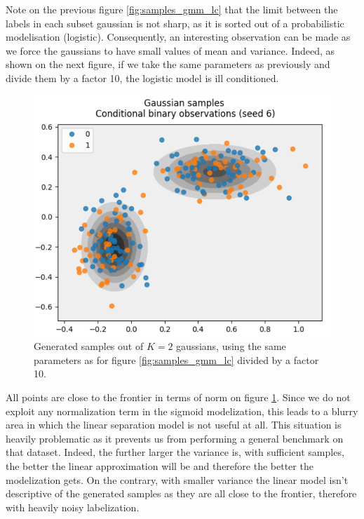 Note on the previous figure \ref{fig:samples_gmm_lc} that the limit between the labels in each subset gaussian is not sharp,
as it is sorted out of a probabilistic modelisation (logistic).
Consequently, an interesting observation can be made as we force the gaussians to have small values of mean and variance.
Indeed, as shown on the next figure, if we take the same parameters as previously and divide them by a factor 10,
the logistic model is ill conditioned.
\begin{figure}[H]
    \center
    \includegraphics[scale=0.7]{images/samples_gmm_lc_badconditioning}
    \caption{Generated samples out of $K=2$ gaussians, using the same parameters as for figure \ref{fig:samples_gmm_lc} divided by a factor 10.}
    \label{fig:gmm_lc_badconditioning}
\end{figure}

All points are close to the frontier in terms of norm on figure \ref{fig:gmm_lc_badconditioning}.
Since we do not exploit any normalization term in the sigmoid modelization, this leads to a blurry area in which the linear separation model is not useful at all.
This situation is heavily problematic as it prevents us from performing a general benchmark on that dataset.
Indeed, the further larger the variance is, with sufficient samples, the better the linear approximation will be and therefore the better the modelization gets.
On the contrary, with smaller variance the linear model isn't descriptive of the generated samples as they are all close to the frontier, therefore with heavily noisy labelization.
